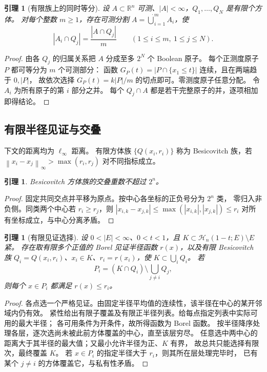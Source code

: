 \documentclass[UTF8,11pt,fontset=none]{ctexart}
\newtheorem{lemma}[theorem]{引理}
\theoremstyle{remark}
\newcommand{\R}{\mathbb R}
\newcommand{\Hc}{\mathcal H_n}
\newcommand{\norm}[1]{\left\lVert#1\right\rVert}
\begin{document}
\begin{lemma}[有限族上的同时等分]\label{lem:partition}
设 \(A\subset\R^n\) 可测、\(|A|<\infty\)，\(Q_1,\ldots,Q_N\) 是有限个方体。
对每个整数 \(m\ge1\)，存在可测分割 \(A=\dot\bigcup_{i=1}^mA_i\)，使
\[
 |A_i\cap Q_j|=\frac{|A\cap Q_j|}{m}
 \qquad(1\le i\le m,\ 1\le j\le N).
\]
\end{lemma}
\begin{proof}
由各 \(Q_j\) 的归属关系把 \(A\) 分成至多 \(2^N\) 个 Boolean 原子。
每个正测度原子 \(P\) 都可等分为 \(m\) 个可测部分：
函数 \(G_P(t)=|P\cap\{x_1\le t\}|\) 连续，且在两端趋于 \(0,|P|\)，
故依次选择 \(G_P(t)=k|P|/m\) 的切点即可。零测度原子任意分配。
令 \(A_i\) 为所有原子的第 \(i\) 部分之并。
每个 \(Q_j\cap A\) 都是若干完整原子的并，逐项相加即得结论。
\end{proof}

\subsection{有限半径见证与交叠}

下文的距离均为 \(\ell_\infty\) 距离。
有限方体族 \(\{Q(x_i,r_i)\}\) 称为 Besicovitch 族，若
\(\norm{x_i-x_j}_\infty>\max(r_i,r_j)\) 对不同指标成立。
\begin{lemma}\label{lem:bip}
Besicovitch 方体族的交叠重数不超过 \(2^n\)。
\end{lemma}
\begin{proof}
固定共同交点并平移为原点。按中心各坐标的正负号分为 \(2^n\) 类，
零归入非负侧。同类两个中心若 \(r_i\ge r_j\)，则
\(|x_{i,k}-x_{j,k}|\le\max(|x_{i,k}|,|x_{j,k}|)\le r_i\)
对所有坐标成立，与中心分离矛盾。
\end{proof}

\begin{lemma}[有限见证选择]\label{lem:finitegreedy}
设 \(0<|E|<\infty\)、\(0<t<1\)，且
\(K\subset\Hc(1-t;E)\setminus E\) 紧。
存在取有限多个正值的 Borel 见证半径函数 \(r(x)\)，以及有限 Besicovitch 族
\(Q_i=Q(x_i,r_i)\)、\(x_i\in K\)、\(r_i=r(x_i)\)，使 \(K\subset\bigcup_iQ_i\)。
若
\[
 P_i=(K\cap Q_i)\setminus\bigcup_{j\ne i}Q_j,
\]
则每个 \(x\in P_i\) 都满足 \(r(x)\le r_i\)。
\end{lemma}
\begin{proof}
各点选一个严格见证。由固定半径平均值的连续性，该半径在中心的某开邻域内仍有效。
紧性给出有限子覆盖及有限正半径列表。给每点指定列表中实际可用的最大半径；
各可用条件为开条件，故所得函数为 Borel 函数。
按半径降序处理各层，逐次选尚未被此前方体覆盖的中心，直至该层穷尽。
任意选中两中心的距离大于其半径的最大值；又最小允许半径为正、\(K\) 有界，
故总共只能选择有限次，最终覆盖 \(K\)。
若 \(x\in P_i\) 的指定半径大于 \(r_i\)，则其所在层处理完毕时，
已有某个 \(j\ne i\) 的方体覆盖它，与私有性矛盾。
\end{proof}
\end{document}
